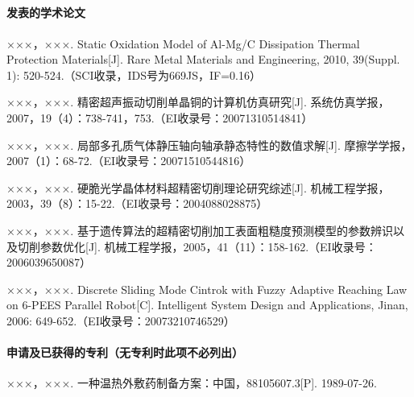 
\begin{appendixenv}

\chapter{}


\subsubsection{发表的学术论文}
\begin{publications}
    \item ×××，×××. Static Oxidation Model of Al-Mg/C Dissipation Thermal Protection Materials[J]. Rare Metal Materials and Engineering, 2010, 39(Suppl. 1): 520-524.（SCI收录，IDS号为669JS，IF=0.16）
    \item ×××，×××. 精密超声振动切削单晶铜的计算机仿真研究[J]. 系统仿真学报，2007，19（4）：738-741，753.（EI收录号：20071310514841）
    \item ×××，×××. 局部多孔质气体静压轴向轴承静态特性的数值求解[J]. 摩擦学学报，2007（1）：68-72.（EI收录号：20071510544816）
    \item ×××，×××. 硬脆光学晶体材料超精密切削理论研究综述[J]. 机械工程学报，2003，39（8）：15-22.（EI收录号：2004088028875）
    \item ×××，×××. 基于遗传算法的超精密切削加工表面粗糙度预测模型的参数辨识以及切削参数优化[J]. 机械工程学报，2005，41（11）：158-162.（EI收录号：2006039650087）
    \item ×××，×××. Discrete Sliding Mode Cintrok with Fuzzy Adaptive Reaching Law on 6-PEES Parallel Robot[C]. Intelligent System Design and Applications, Jinan, 2006: 649-652.（EI收录号：20073210746529）
\end{publications}

\subsubsection{申请及已获得的专利（无专利时此项不必列出）}
\begin{achievements}
    \item ×××，×××. 一种温热外敷药制备方案：中国，88105607.3[P]. 1989-07-26.
\end{achievements}


\end{appendixenv}
